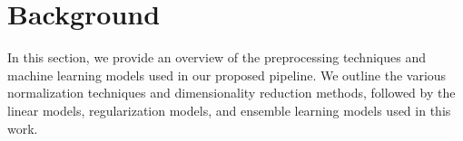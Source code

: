 \section{Background}\label{sec:background}
In this section, we provide an overview of the preprocessing techniques and machine learning models used in our proposed pipeline.
We outline the various normalization techniques and dimensionality reduction methods, followed by the linear models, regularization models, and ensemble learning models used in this work.



